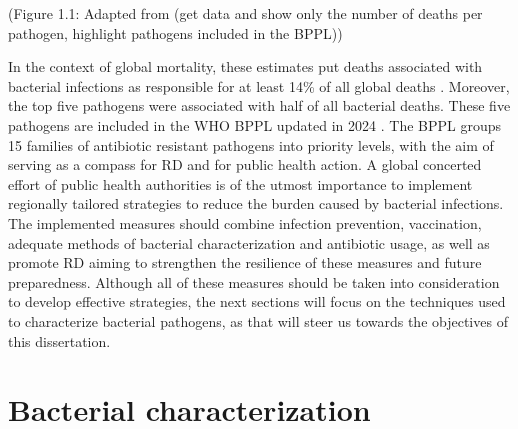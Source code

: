 (Figure 1.1: Adapted from \cite{ikuta_global_2022} (get data and show only the number of deaths per pathogen, highlight pathogens included in the \ac{BPPL}))

In the context of global mortality, these estimates put deaths associated with bacterial infections as responsible for at least 14\% of all global deaths \cite{ikuta_global_2022}. Moreover, the top five pathogens were associated with half of all bacterial deaths. These five pathogens are included in the WHO \ac{BPPL} updated in 2024 \cite{noauthor_who_2024}. The \ac{BPPL} groups 15 families of antibiotic resistant pathogens into priority levels, with the aim of serving as a compass for \ac{RD} and for public health action. A global concerted effort of public health authorities is of the utmost importance to implement regionally tailored strategies to reduce the burden caused by bacterial infections. The implemented measures should combine infection prevention, vaccination, adequate methods of bacterial characterization and antibiotic usage, as well as promote \ac{RD} aiming to strengthen the resilience of these measures and future preparedness. Although all of these measures should be taken into consideration to develop effective strategies, the next sections will focus on the techniques used to characterize bacterial pathogens, as that will steer us towards the objectives of this dissertation.

\section{Bacterial characterization}

